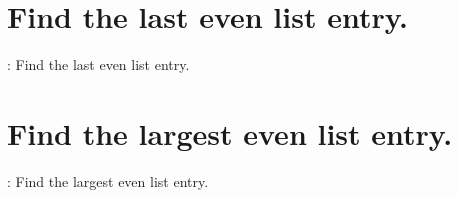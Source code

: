 \documentclass[preview]{standalone}
\begin{document}
\section{Find the last even list entry.}
\color{lightgray} \begin{algorithm}
    \renewcommand{\thealgorithm}{3107}
    \caption{: Find the last even list entry.} 
    
\end{algorithm} \color{black}
\begin{center}
    
\end{center}
\text{\\}
\begin{center}
    
\end{center}
\pagebreak


\section{Find the largest even list entry.}
\color{lightgray} \begin{algorithm}
    \renewcommand{\thealgorithm}{3108}
    \caption{: Find the largest even list entry.}
    
\end{algorithm} \color{black}
\begin{center}
    
\end{center}
\text{\\}
\begin{center}
    
\end{center}
\pagebreak
\end{document}
